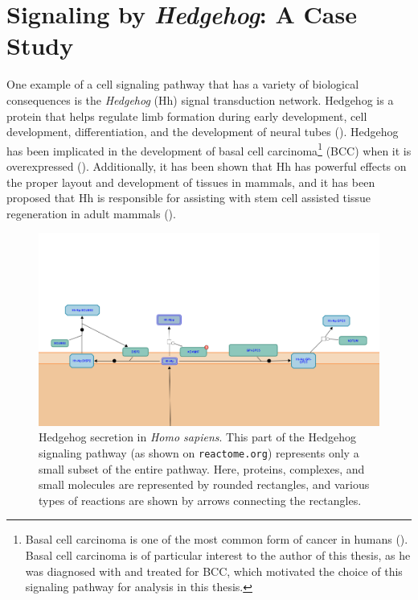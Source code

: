 \documentclass[12pt,twoside]{reedthesis}
\theoremstyle{definition}
\begin{document}
\section{Signaling by \emph{Hedgehog}: A Case Study}

One example of a cell signaling pathway that has a variety of biological consequences is the \textit{Hedgehog} (Hh) signal transduction network. Hedgehog is a protein that helps regulate limb formation during early development, cell development, differentiation, and the development of neural tubes (\cite{Hui2011}). Hedgehog has been implicated in the development of basal cell carcinoma\footnote{Basal cell carcinoma is one of the most common form of cancer in humans (\cite{Rubin2009}). Basal cell carcinoma is of particular interest to the author of this thesis, as he was diagnosed with and treated for BCC, which motivated the choice of this signaling pathway for analysis in this thesis.} (BCC) when it is overexpressed (\cite{Dahmane1997}). Additionally, it has been shown that Hh has powerful effects on the proper layout and development of tissues in mammals, and it has been proposed that Hh is responsible for assisting with stem cell assisted tissue regeneration in adult mammals (\cite{Ahn2005}).

\begin{figure}[h]
  \begin{center}
    \includegraphics[width=\textwidth]{Hh-Np_secretion}
  \caption[Hedgehog secretion in \textit{Homo sapiens}.]{Hedgehog secretion in \textit{Homo sapiens}. This part of the Hedgehog signaling pathway (as shown on \texttt{reactome.org}) represents only a small subset of the entire pathway. Here, proteins, complexes, and small molecules are represented by rounded rectangles, and various types of reactions are shown by arrows connecting the rectangles.}
  \label{fig:Hh-Np_secretion}
  \end{center}
\end{figure}
\end{document}
